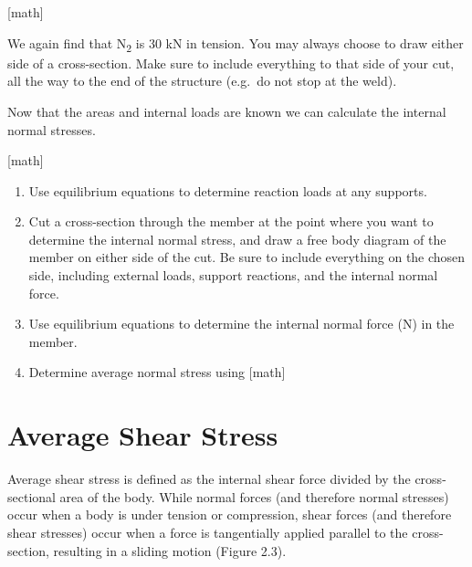 \documentclass[
  letterpaper,
  DIV=11,
  numbers=noendperiod]{scrreprt}
\begin{document}
\begin{tcolorbox}
\begin{tcolorbox}
{[}math{]}

We again find that N\textsubscript{2} is 30 kN in tension. You may
always choose to draw either side of a cross-section. Make sure to
include everything to that side of your cut, all the way to the end of
the structure (e.g.~do not stop at the weld).

Now that the areas and internal loads are known we can calculate the
internal normal stresses.

{[}math{]}

\end{tcolorbox}

\end{tcolorbox}

\begin{tcolorbox}[enhanced jigsaw, colbacktitle=quarto-callout-note-color!10!white, title={Step-by-step: Needs title}, coltitle=black, leftrule=.75mm, rightrule=.15mm, opacityback=0, breakable, colframe=quarto-callout-note-color-frame, left=2mm, arc=.35mm, colback=white, bottomrule=.15mm, bottomtitle=1mm, toptitle=1mm, titlerule=0mm, opacitybacktitle=0.6, toprule=.15mm]

\begin{enumerate}
\def\labelenumi{\arabic{enumi}.}
\item
  Use equilibrium equations to determine reaction loads at any supports.
\item
  Cut a cross-section through the member at the point where you want to
  determine the internal normal stress, and draw a free body diagram of
  the member on either side of the cut. Be sure to include everything on
  the chosen side, including external loads, support reactions, and the
  internal normal force.
\item
  Use equilibrium equations to determine the internal normal force (N)
  in the member.
\item
  Determine average normal stress using {[}math{]}
\end{enumerate}

\end{tcolorbox}

\section{Average Shear Stress}\label{average-shear-stress}

Average shear stress is defined as the internal shear force divided by
the cross-sectional area of the body. While normal forces (and therefore
normal stresses) occur when a body is under tension or compression,
shear forces (and therefore shear stresses) occur when a force is
tangentially applied parallel to the cross-section, resulting in a
sliding motion (Figure 2.3).
\end{document}
